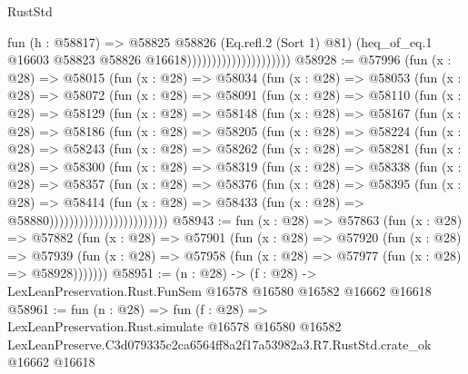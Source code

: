 \begin{lexlean}{RustStd}
\begin{coremodule}
                                          fun (h : @58817) =>
                                          @58825
                                            @58826
                                            (Eq.refl.{2} (Sort 1) @81)
                                            (heq_of_eq.{1}
                                              @16603
                                              @58823
                                              @58826
                                              @16618)))))))))))))))))))))
@58928 := @57996
    (fun (x : @28) =>
    @58015
      (fun (x : @28) =>
      @58034
        (fun (x : @28) =>
        @58053
          (fun (x : @28) =>
          @58072
            (fun (x : @28) =>
            @58091
              (fun (x : @28) =>
              @58110
                (fun (x : @28) =>
                @58129
                  (fun (x : @28) =>
                  @58148
                    (fun (x : @28) =>
                    @58167
                      (fun (x : @28) =>
                      @58186
                        (fun (x : @28) =>
                        @58205
                          (fun (x : @28) =>
                          @58224
                            (fun (x : @28) =>
                            @58243
                              (fun (x : @28) =>
                              @58262
                                (fun (x : @28) =>
                                @58281
                                  (fun (x : @28) =>
                                  @58300
                                    (fun (x : @28) =>
                                    @58319
                                      (fun (x : @28) =>
                                      @58338
                                        (fun (x : @28) =>
                                        @58357
                                          (fun (x : @28) =>
                                          @58376
                                            (fun (x : @28) =>
                                            @58395
                                              (fun (x : @28) =>
                                              @58414
                                                (fun (x : @28) =>
                                                @58433
                                                  (fun (x : @28) => @58880))))))))))))))))))))))))
@58943 := fun (x : @28) =>
  @57863
    (fun (x : @28) =>
    @57882
      (fun (x : @28) =>
      @57901
        (fun (x : @28) =>
        @57920
          (fun (x : @28) =>
          @57939 (fun (x : @28) => @57958 (fun (x : @28) => @57977 (fun (x : @28) => @58928)))))))
@58951 := (n : @28) ->
  (f : @28) -> LexLeanPreservation.Rust.FunSem @16578 @16580 @16582 @16662 @16618
@58961 := fun (n : @28) =>
  fun (f : @28) =>
  LexLeanPreservation.Rust.simulate
    @16578
    @16580
    @16582
    LexLeanPreserve.C3d079335c2ca6564ff8a2f17a53982a3.R7.RustStd.crate_ok
    @16662
    @16618
\end{coremodule}
\end{lexlean}

